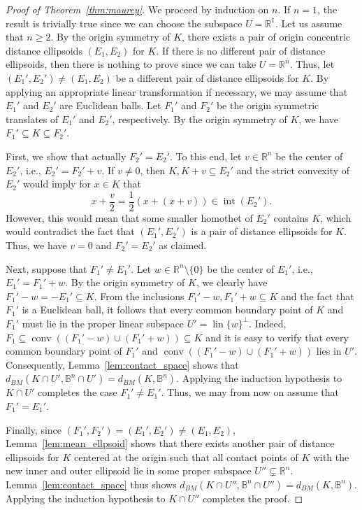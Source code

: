 \documentclass[12pt,a4paper]{article}
\theoremstyle{definition}
\DeclareMathOperator{\conv}{conv}
\DeclareMathOperator{\lin}{lin}
\DeclareMathOperator{\inte}{int}
\newcommand\R{\mathbb{R}}
\newcommand\B{\mathbb{B}}
\begin{document}
\begin{proof}[Proof of Theorem~\ref{thm:maurey}]
We proceed by induction on $n$. If $n=1$, the result is trivially true since we can choose the subspace $U = \R^1$. Let us assume that $n \geq 2$. By the origin symmetry of $K$, there exists a pair of origin concentric distance ellipsoids $(E_1,E_2)$ for $K$. If there is no different pair of distance ellipsoids, then there is nothing to prove since we can take $U = \R^n$. Thus, let $(E_1',E_2') \neq (E_1, E_2)$ be a different pair of distance ellipsoids for $K$. By applying an appropriate linear transformation if necessary, we may assume that $E_1'$ and $E_2'$ are Euclidean balls. Let $F_1'$ and $F_2'$ be the origin symmetric translates of $E_1'$ and $E_2'$, respectively. By the origin symmetry of $K$, we have $F_1' \subseteq K \subseteq F_2'$.

First, we show that actually $F_2' = E_2'$. To this end, let $v \in \R^n$ be the center of $E_2'$, i.e., $E_2' = F_2' + v$. If $v\neq 0$, then $K, K + v \subseteq E_2'$ and the strict convexity of $E_2'$ would imply for $x \in K$ that
$$ x + \frac{v}{2} = \frac{1}{2} ( x + (x+v) ) \in \inte(E_2'). $$
However, this would mean that some smaller homothet of $E_2'$ contains $K$, which would contradict the fact that $(E_1',E_2')$ is a pair of distance ellipsoids for $K$. Thus, we have $v=0$ and $F_2' = E_2'$ as claimed.

Next, suppose that $F_1' \neq E_1'$. Let $w \in \R^n \setminus \{0\}$ be the center of $E_1'$, i.e., $E_1' = F_1' + w$. By the origin symmetry of $K$, we clearly have $F_1' - w = -E_1' \subseteq K$. From the inclusions $F_1' - w, F_1' + w \subseteq K$ and the fact that $F_1'$ is a Euclidean ball, it follows that every common boundary point of $K$ and $F_1'$ must lie in the proper linear subspace $U' = \lin\{w\}^\perp$. Indeed, $F_1 \subseteq  \conv( (F_1' - w) \cup (F_1' + w)) \subseteq K$ and it is easy to verify that every common boundary point of $F_1'$ and $\conv( (F_1' - w) \cup (F_1' + w))$ lies in $U'$. Consequently, Lemma~\ref{lem:contact_space} shows that $d_{BM}(K \cap U', \B^n \cap U') = d_{BM}(K,\B^n)$. Applying the induction hypothesis to $K \cap U'$ completes the case $F_1' \neq E_1'$. Thus, we may from now on assume that $F_1' = E_1'$.
\newpage

Finally, since $(F_1',F_2') = (E_1',E_2') \neq (E_1,E_2)$, Lemma~\ref{lem:mean_ellpsoid} shows that there exists another pair of distance ellipsoids for $K$ centered at the origin such that all contact points of $K$ with the new inner and outer ellipsoid lie in some proper subspace $U'' \subsetneq \R^n$. Lemma~\ref{lem:contact_space} thus shows $d_{BM}(K \cap U'',\B^n \cap U'') = d_{BM}(K,\B^n)$. Applying the induction hypothesis to $K \cap U''$ completes the proof.
\end{proof}
\end{document}
